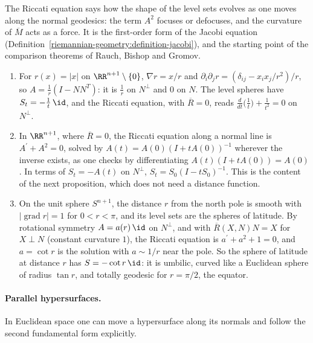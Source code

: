 The Riccati equation says how the shape of the level sets evolves as one moves along the normal geodesics: the term $A^2$ focuses or defocuses, and the curvature of $\overline{M}$ acts as a force. It is
the first-order form of the Jacobi equation (Definition~\ref{riemannian-geometry:definition-jacobi}), and the starting point of the comparison theorems of Rauch, Bishop and Gromov.

\begin{example}\label{riemannian-geometry:example-distance-functions}
\begin{enumerate}
\item For $r(x) = |x|$ on $\RR^{n+1} \setminus \{0\}$, $\nabla r = x/r$ and $\partial_i\partial_jr = (\delta_{ij} - x_ix_j/r^2)/r$, so $A = \frac1r(I - NN^T)$: it is $\frac1r$ on $N^\perp$ and $0$ on $N$. The level spheres
have $S_t = -\frac1t\,\id$, and the Riccati equation, with $\overline{R} = 0$, reads $\frac{d}{dt}\bigl(\frac1t\bigr) + \frac{1}{t^2} = 0$ on $N^\perp$.
\item In $\RR^{n+1}$, where $\overline{R} = 0$, the Riccati equation along a normal line is $A^{\prime} + A^2 = 0$, solved by $A(t) = A(0)(I + tA(0))^{-1}$ wherever the inverse exists, as one checks by
differentiating $A(t)(I + tA(0)) = A(0)$. In terms of $S_t = -A(t)$ on $N^\perp$, $S_t = S_0(I - tS_0)^{-1}$. This is the content of the next proposition, which does not need a distance function.
\item On the unit sphere $S^{n+1}$, the distance $r$ from the north pole is smooth with $|\operatorname{grad}r| = 1$ for $0 < r < \pi$, and its level sets are the spheres of latitude. By rotational symmetry
$A = a(r)\,\id$ on $N^\perp$, and with $\overline{R}(X, N)N = X$ for $X \perp N$ (constant curvature $1$), the Riccati equation is $a^{\prime} + a^2 + 1 = 0$, and $a = \cot r$ is the solution with $a \sim 1/r$ near the pole.
So the sphere of latitude at distance $r$ has $S = -\cot r\,\id$: it is umbilic, curved like a Euclidean sphere of radius $\tan r$, and totally geodesic for $r = \pi/2$, the equator.
\end{enumerate}
\end{example}

\paragraph{Parallel hypersurfaces.} In Euclidean space one can move a hypersurface along its normals and follow the second fundamental form explicitly.

